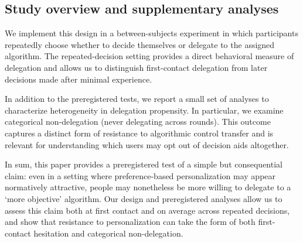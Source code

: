 \documentclass[a4paper, 12pt, fleqn]{article}
\theoremstyle{definition}
\begin{document}
\subsection*{Study overview and supplementary analyses}
We implement this design in a between-subjects experiment in which participants repeatedly choose whether to decide themselves or delegate to the assigned algorithm. The repeated-decision setting provides a direct behavioral measure of delegation and allows us to distinguish first-contact delegation from later decisions made after minimal experience.

In addition to the preregistered tests, we report a small set of analyses to characterize heterogeneity in delegation propensity. In particular, we examine categorical non-delegation (never delegating across rounds). This outcome captures a distinct form of resistance to algorithmic control transfer and is relevant for understanding which users may opt out of decision aids altogether.

In sum, this paper provides a preregistered test of a simple but consequential claim: even in a setting where preference-based personalization may appear normatively attractive, people may nonetheless be more willing to delegate to a `more objective' algorithm. Our design and preregistered analyses allow us to assess this claim both at first contact and on average across repeated decisions, and show that resistance to personalization can take the form of both first-contact hesitation and categorical non-delegation.
\end{document}
